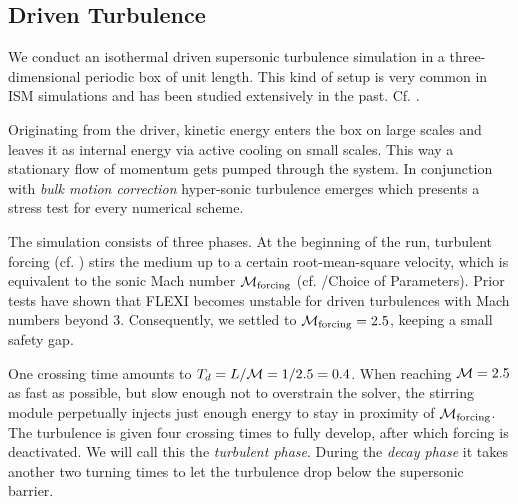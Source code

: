\subsection{Driven Turbulence}
\label{sec:stirturb}

We conduct an isothermal driven supersonic turbulence simulation in a
three-dimensional periodic box of unit length. This kind of setup is very
common in ISM simulations and has been studied extensively in the past. Cf.
\cite{schmidt2009numerical,kitsionas2009algorithmic,0004-637X-665-1-416,mac1998kinetic}.

Originating from the driver, kinetic energy enters the box on large scales
and leaves it as internal energy via active cooling on small scales. This way a
stationary flow of momentum gets pumped through the system.  In conjunction
with \emph{bulk motion correction} hyper-sonic turbulence emerges which
presents a stress test for every numerical scheme.

The simulation consists of three phases. At the beginning of the run, turbulent
forcing (cf. ) stirs the medium up to a certain
root-mean-square velocity, which is equivalent to the sonic Mach number
$\mathcal{M}_{\text{forcing}}$ (cf. /Choice of Parameters).
Prior tests have shown that FLEXI becomes unstable for driven turbulences with
Mach numbers beyond 3.  Consequently, we settled to $\mathcal{M}_{\text{forcing}} =
2.5$, keeping a small safety gap.

One crossing time amounts to $T_d = L/\mathcal{M} = 1/2.5 = 0.4$.  When reaching
$\mathcal{M} = 2.5$ as fast as possible, but slow enough not to overstrain the solver, the
stirring module perpetually injects just enough energy to stay in proximity of
$\mathcal{M}_{\text{forcing}}$. The turbulence is given four crossing times to fully
develop, after which forcing is deactivated.  We will call this the
\emph{turbulent phase}. During the \emph{decay phase} it takes another two
turning times to let the turbulence drop below the supersonic barrier.

